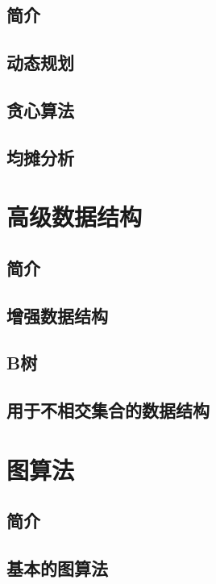 \documentclass[lang=cn,newtx,10pt,scheme=chinese]{elegantbook}
\begin{document}
\chapter*{简介}

\chapter{动态规划}

\chapter{贪心算法}

\chapter{均摊分析}

\part{高级数据结构}

\chapter*{简介}

\chapter{增强数据结构}

\chapter{B树}

\chapter{用于不相交集合的数据结构}

\part{图算法}

\chapter*{简介}

\chapter{基本的图算法}
\end{document}
